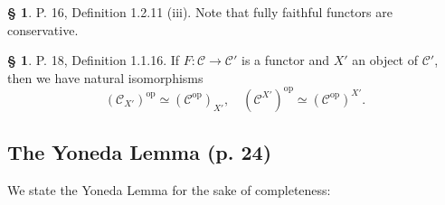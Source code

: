 \documentclass[12pt]{article}%
\theoremstyle{remark}
\theoremstyle{definition}
\newtheorem{s}[thm]{\S}%
\newcommand{\C}{\mathcal C}
\DeclareMathOperator{\op}{op}
\begin{document}
%

\begin{s}\label{ffc}
P. 16, Definition 1.2.11 (iii). Note that fully faithful functors are conservative. 
\end{s}

%

\begin{s}
P. 18, Definition 1.1.16. If $F:\C\to\C'$ is a functor and $X'$ an object of $\C'$, then we have natural isomorphisms 
\begin{equation}\label{opslice}
(\C_{X'})^{\op}\simeq(\C^{\op})_{X'},\quad(\C^{X'})^{\op}\simeq(\C^{\op})^{X'}.
\end{equation}
\end{s}


\subsection{The Yoneda Lemma (p. 24)}

We state the Yoneda Lemma for the sake of completeness:
\end{document}
